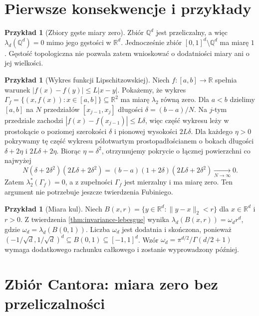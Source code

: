 \documentclass[11pt,a4paper,oneside]{book}
\numberwithin{equation}{chapter}
\theoremstyle{plain}
\theoremstyle{definition}
\newtheorem{przyklad}[twierdzenie]{Przykład}
\theoremstyle{remark}
\begin{document}
\section{Pierwsze konsekwencje i przykłady}

\begin{przyklad}[Zbiory gęste miary zero]
Zbiór $\mathbb Q^d$ jest przeliczalny, a więc
$\lambda_d(\mathbb Q^d)=0$ mimo jego gęstości
w $\mathbb R^d$. Jednocześnie zbiór
$[0,1]^d\setminus\mathbb Q^d$ ma miarę $1$.
Gęstość topologiczna nie pozwala zatem wnioskować
o dodatniości miary ani o jej wielkości.
\end{przyklad}

\begin{przyklad}[Wykres funkcji Lipschitzowskiej]
\label{ex:lipschitz-graph-null}
Niech $f:[a,b]\to\mathbb R$ spełnia warunek
$|f(x)-f(y)|\le L|x-y|$.
Pokażemy, że wykres
$\Gamma_f=\{(x,f(x)):x\in[a,b]\}\subseteq\mathbb R^2$
ma miarę $\lambda_2$ równą zero.
Dla $a<b$ dzielimy $[a,b]$ na $N$ przedziałów
$[x_{j-1},x_j]$ długości $\delta=(b-a)/N$.
Na $j$-tym przedziale zachodzi
$|f(x)-f(x_{j-1})|\le L\delta$, więc część wykresu
leży w prostokącie o poziomej szerokości $\delta$
i pionowej wysokości $2L\delta$.
Dla każdego $\eta>0$ pokrywamy tę część wykresu
półotwartym prostopadłościanem o bokach długości
$\delta+2\eta$ i $2L\delta+2\eta$.
Biorąc $\eta=\delta^2$, otrzymujemy pokrycie o
łącznej powierzchni co najwyżej
\[
N(\delta+2\delta^2)(2L\delta+2\delta^2)
=(b-a)(1+2\delta)(2L\delta+2\delta^2)
\xrightarrow[N\to\infty]{}0.
\]
Zatem $\lambda_2^*(\Gamma_f)=0$, a z zupełności
$\Gamma_f$ jest mierzalny i ma miarę zero.
Ten argument nie potrzebuje jeszcze twierdzenia Fubiniego.
\end{przyklad}

\begin{przyklad}[Miara kul]
Niech $B(x,r)=\{y\in\mathbb R^d:\|y-x\|_2<r\}$
dla $x\in\mathbb R^d$ i $r>0$.
Z twierdzenia \ref{thm:invariance-lebesgue}
wynika $\lambda_d(B(x,r))=\omega_dr^d$,
gdzie $\omega_d=\lambda_d(B(0,1))$.
Liczba $\omega_d$ jest dodatnia i skończona, ponieważ
$(-1/\sqrt d,1/\sqrt d)^d\subseteq B(0,1)
\subseteq[-1,1]^d$. Wzór
$\omega_d=\pi^{d/2}/\Gamma(d/2+1)$ wymaga dodatkowego
rachunku całkowego i zostanie wyprowadzony później.
\end{przyklad}

\section{Zbiór Cantora: miara zero bez przeliczalności}
\end{document}
